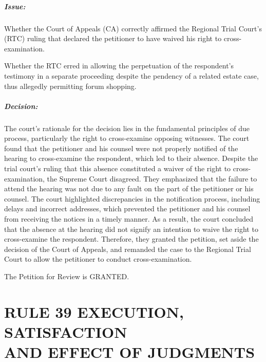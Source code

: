 \documentclass[
12pt,
oneside,
onehalfspacing,
headsepline
]{DigestCollection}
\begin{document}
\paragraph{Issue:}
\label{704c1c80-124e-11ef-aa24-9916ea601717}


Whether the Court of Appeals (CA) correctly affirmed the Regional Trial Court's (RTC) ruling that declared the petitioner to have waived his right to cross-examination.

Whether the RTC erred in allowing the perpetuation of the respondent's testimony in a separate proceeding despite the pendency of a related estate case, thus allegedly permitting forum shopping.

\paragraph{Decision:}
\label{6ddc7c10-124e-11ef-aa24-9916ea601717}


The court's rationale for the decision lies in the fundamental principles of due process, particularly the right to cross-examine opposing witnesses. The court found that the petitioner and his counsel were not properly notified of the hearing to cross-examine the respondent, which led to their absence. Despite the trial court's ruling that this absence constituted a waiver of the right to cross-examination, the Supreme Court disagreed. They emphasized that the failure to attend the hearing was not due to any fault on the part of the petitioner or his counsel. The court highlighted discrepancies in the notification process, including delays and incorrect addresses, which prevented the petitioner and his counsel from receiving the notices in a timely manner. As a result, the court concluded that the absence at the hearing did not signify an intention to waive the right to cross-examine the respondent. Therefore, they granted the petition, set aside the decision of the Court of Appeals, and remanded the case to the Regional Trial Court to allow the petitioner to conduct cross-examination.

The Petition for Review is GRANTED.

\chapter{RULE 39 EXECUTION, SATISFACTION \\AND EFFECT OF JUDGMENTS}
\label{d2494470-0a16-11ef-932c-63c852f65e48}


\label{d25daf70-0a19-11ef-932c-63c852f65e48}
\end{document}
